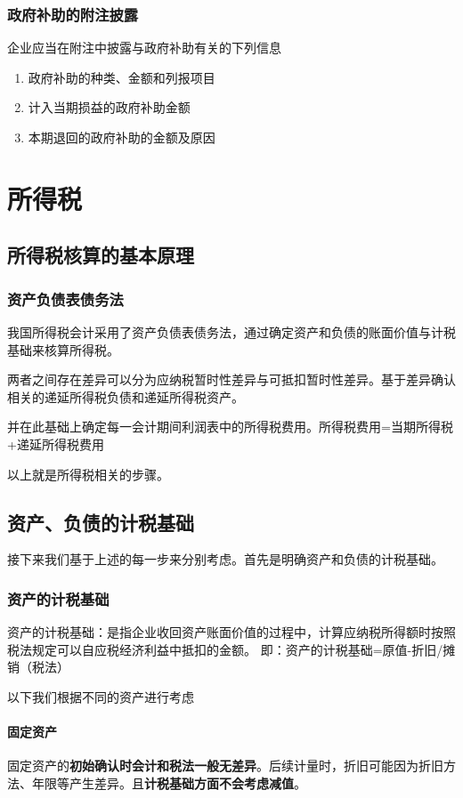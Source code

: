 \documentclass[UTF8,12pt]{ctexart}
\numberwithin{equation}{section} %
\numberwithin{figure}{section}
\numberwithin{table}{section}
\begin{document}
	\subsubsection{政府补助的附注披露}
	企业应当在附注中披露与政府补助有关的下列信息
	\begin{enumerate}
		\item 政府补助的种类、金额和列报项目
		
		\item 计入当期损益的政府补助金额
		
		\item 本期退回的政府补助的金额及原因
	\end{enumerate}
	
	\newpage
	\section{所得税}
	\subsection{所得税核算的基本原理}
	\subsubsection{资产负债表债务法}
	
	我国所得税会计采用了资产负债表债务法，通过确定资产和负债的账面价值与计税基础来核算所得税。
	
	两者之间存在差异可以分为应纳税暂时性差异与可抵扣暂时性差异。基于差异确认相关的递延所得税负债和递延所得税资产。
	
	并在此基础上确定每一会计期间利润表中的所得税费用。所得税费用=当期所得税+递延所得税费用
	
	以上就是所得税相关的步骤。
	
	\subsection{资产、负债的计税基础}
	接下来我们基于上述的每一步来分别考虑。首先是明确资产和负债的计税基础。
	
	\subsubsection{资产的计税基础}
	资产的计税基础：是指企业收回资产账面价值的过程中，计算应纳税所得额时按照税法规定可以自应税经济利益中抵扣的金额。
	即：资产的计税基础=原值-折旧/摊销（税法）
	
	以下我们根据不同的资产进行考虑
	\paragraph{固定资产}
	固定资产的\textbf{初始确认时会计和税法一般无差异}。后续计量时，折旧可能因为折旧方法、年限等产生差异。且\textbf{计税基础方面不会考虑减值}。
	
\end{document}
